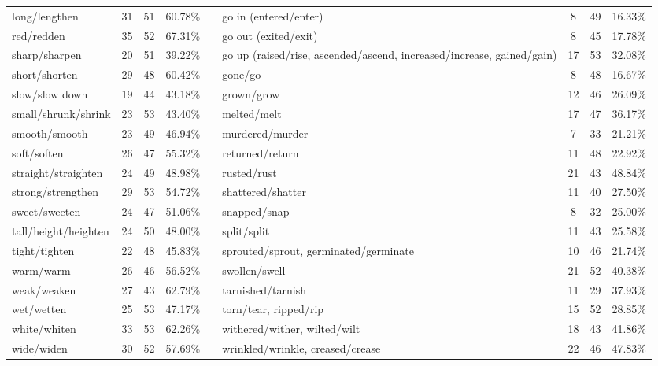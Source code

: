 \begin{tabular}{p{3cm}ccccp{3cm}ccc}
long/lengthen & 31 & 51 & 60.78\% & & go in (entered/enter) & 8 & 49 & 16.33\% \\
red/redden & 35 & 52 & 67.31\% & & go out (exited/exit) & 8 & 45 & 17.78\% \\
sharp/sharpen & 20 & 51 & 39.22\% & & go up (raised/rise, ascended/ascend, increased/increase, gained/gain) & 17 & 53 & 32.08\% \\
short/shorten & 29 & 48 & 60.42\% & & gone/go & 8 & 48 & 16.67\% \\
slow/slow down & 19 & 44 & 43.18\% & & grown/grow & 12 & 46 & 26.09\% \\
small/shrunk/shrink & 23 & 53 & 43.40\% & & melted/melt & 17 & 47 & 36.17\% \\
smooth/smooth & 23 & 49 & 46.94\% & & murdered/murder & 7 & 33 & 21.21\% \\
soft/soften & 26 & 47 & 55.32\% & & returned/return & 11 & 48 & 22.92\% \\
straight/straighten & 24 & 49 & 48.98\% & & rusted/rust & 21 & 43 & 48.84\% \\
strong/strengthen & 29 & 53 & 54.72\% & & shattered/shatter & 11 & 40 & 27.50\% \\
sweet/sweeten & 24 & 47 & 51.06\% & & snapped/snap & 8 & 32 & 25.00\% \\
tall/height/heighten & 24 & 50 & 48.00\% & & split/split & 11 & 43 & 25.58\% \\
tight/tighten & 22 & 48 & 45.83\% & & sprouted/sprout, germinated/germinate & 10 & 46 & 21.74\% \\
warm/warm & 26 & 46 & 56.52\% & & swollen/swell & 21 & 52 & 40.38\% \\
weak/weaken & 27 & 43 & 62.79\% & & tarnished/tarnish & 11 & 29 & 37.93\% \\
wet/wetten & 25 & 53 & 47.17\% & & torn/tear, ripped/rip & 15 & 52 & 28.85\% \\
white/whiten & 33 & 53 & 62.26\% & & withered/wither, wilted/wilt & 18 & 43 & 41.86\% \\
wide/widen & 30 & 52 & 57.69\% & & wrinkled/wrinkle, creased/crease & 22 & 46 & 47.83\%
\end{tabular}